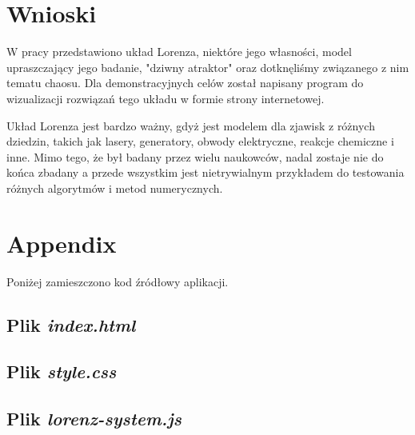 \documentclass[12pt]{report}
\begin{document}
\chapter{Wnioski}
	\par W pracy przedstawiono układ Lorenza, niektóre jego własności, model upraszczający jego badanie, "dziwny atraktor" oraz dotknęliśmy związanego z nim tematu chaosu. Dla demonstracyjnych celów został napisany program do wizualizacji rozwiązań tego układu w formie strony internetowej.
	
	\par Układ Lorenza jest bardzo ważny, gdyż jest modelem dla zjawisk z różnych dziedzin, takich jak lasery, generatory, obwody elektryczne, reakcje chemiczne i inne. Mimo tego, że był badany przez wielu naukowców, nadal zostaje nie do końca zbadany a przede wszystkim jest nietrywialnym przykładem do testowania różnych algorytmów i metod numerycznych. 

\chapter{Appendix}
	Poniżej zamieszczono kod źródłowy aplikacji.
	
	\section{Plik \textit{index.html}}
	\label{sec:html}
	
	
	\section{Plik \textit{style.css}}
	\label{sec:css}
	
	
	\section{Plik \textit{lorenz-system.js}}
	\label{sec:js}
	
	


\end{document}
